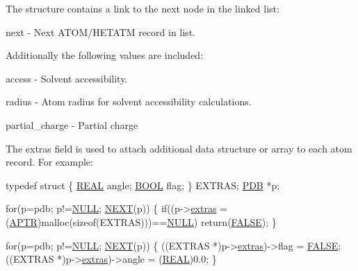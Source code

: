 The structure contains a link to the next node in the linked list\-:


\begin{DoxyItemize}
\item next -\/ Next A\-T\-O\-M/\-H\-E\-T\-A\-T\-M record in list.
\end{DoxyItemize}

Additionally the following values are included\-:


\begin{DoxyItemize}
\item access -\/ Solvent accessibility.
\item radius -\/ Atom radius for solvent accessibility calculations.
\item partial\-\_\-charge -\/ Partial charge
\end{DoxyItemize}

The extras field is used to attach additional data structure or array to each atom record. For example\-:


\begin{DoxyCode}
\textcolor{keyword}{typedef} \textcolor{keyword}{struct}
\{
   \hyperlink{_math_type_8h_a5821460e95a0800cf9f24c38915cbbde}{REAL} angle;
   \hyperlink{_sys_defs_8h_a2df9d82ef74025dde989a5ae3edc886c}{BOOL} flag;
\}  EXTRAS;
\hyperlink{structpdb__entry}{PDB} *p;

\textcolor{keywordflow}{for}(p=pdb; p!=\hyperlink{array2_8c_a070d2ce7b6bb7e5c05602aa8c308d0c4}{NULL}; \hyperlink{macros_8h_a184eb1eeb21deade2e180823b4a0e04c}{NEXT}(p))
\{
   \textcolor{keywordflow}{if}((p->\hyperlink{structpdb__entry_a65eaf0a41f0a5ac660c5fecad6d247b9}{extras} = (\hyperlink{_sys_defs_8h_a201013872f88d6f535b12e644d7f4d5a}{APTR})malloc(\textcolor{keyword}{sizeof}(EXTRAS)))==\hyperlink{array2_8c_a070d2ce7b6bb7e5c05602aa8c308d0c4}{NULL})
      \textcolor{keywordflow}{return}(\hyperlink{macros_8h_aa93f0eb578d23995850d61f7d61c55c1}{FALSE});
\}

\textcolor{keywordflow}{for}(p=pdb; p!=\hyperlink{array2_8c_a070d2ce7b6bb7e5c05602aa8c308d0c4}{NULL}; \hyperlink{macros_8h_a184eb1eeb21deade2e180823b4a0e04c}{NEXT}(p))
\{
   ((EXTRAS *)p->\hyperlink{structpdb__entry_a65eaf0a41f0a5ac660c5fecad6d247b9}{extras})->flag = \hyperlink{macros_8h_aa93f0eb578d23995850d61f7d61c55c1}{FALSE};
   ((EXTRAS *)p->\hyperlink{structpdb__entry_a65eaf0a41f0a5ac660c5fecad6d247b9}{extras})->angle = (\hyperlink{_math_type_8h_a5821460e95a0800cf9f24c38915cbbde}{REAL})0.0;
\}
\end{DoxyCode}
 